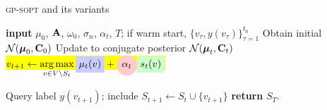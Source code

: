 \documentclass[size36_42,landscape]{a0poster}
\newcommand{\COMMENTEQ}[2][3em]{%
  \leavevmode\hfill\makebox[#1][l]{//~#2}}
\def\CBOX#1{\colorbox{yellow}{#1}}
\newenvironment{coldinglist}[2]	    {
\begin{list}
  {\textcolor{#2}{\ding{#1}}}{
\setlength{\parskip}{0pt}
\setlength{\itemsep}{0pt}
\setlength{\parsep}{0pt}
}
	}
	{\end{list}}
\def\bc{{\bf c}}
\def\be{{\bf e}}
\DeclareMathOperator*{\argmax}{\arg\max}
\begin{document}
\begin{multicols}{3}
\begin{center}
\vspace{-.4em}
\begin{minipage}{.9\linewidth}
\begin{algorithm}[H]
    \Large
	\caption{\Large \textsc{gp-sopt} and its variants}
	\begin{algorithmic}
  	\STATE \textbf{input} $\mu_0$, $\mathbf{A}$, $\omega_0$, $\sigma_n$, $\alpha_t$, $T$;
  	if warm start, $\{v_\tau,y(v_\tau)\}_{\tau=1}^{t_0}$
	\STATE Obtain initial $\mathcal{N}(\boldsymbol{\mu}_{0},\mathbf{C}_{0})$ \COMMENTEQ{\eqref{eq:prior}}
 	\STATE Update to conjugate posterior $\mathcal{N}(\boldsymbol{\mu}_t, \mathbf{C}_t)$ 
\STATE \CBOX{$\displaystyle v_{t+1}\leftarrow \argmax_{v\in V\setminus S_t}
 \tikz[baseline,remember picture]{\node[fill=blue!20,anchor=base] (mut) {$ \mu_t(v)$};}
 +
 \tikz[baseline,remember picture]{\node[fill=red!20, circle, anchor=base] (aat) {$ \alpha_t$};}
 \tikz[baseline,remember picture]{\node[fill=green!20,anchor=base] (sigmat) {$ s_t(v)$};}$}
  \hfill {}

	\STATE Query label $y(v_{t+1})$; include $S_{t+1} \leftarrow S_t \cup \{v_{t+1}\}$
	\ENDFOR
	\STATE \textbf{return} $S_T$.
	\end{algorithmic}
\end{algorithm}
\end{minipage}
\vspace{.4em}
\end{center}


\begin{coldinglist}{112}{blue}
    

\end{coldinglist}
\end{multicols}
\end{document}
